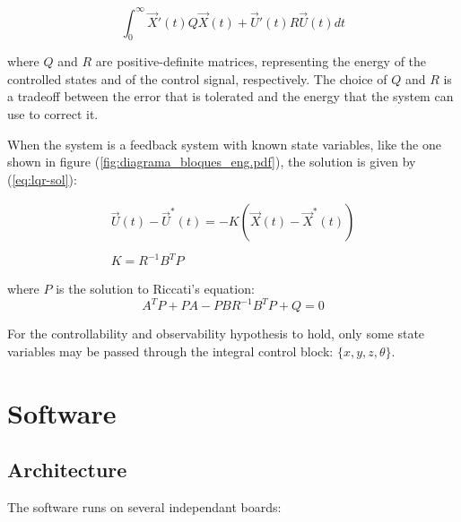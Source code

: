 \documentclass[conference]{IEEEtran}
\newcommand{\refp}[1]{(\ref{#1})}
\begin{document}
\begin{equation}
\label{eq:lqr}
\int_{0}^{\infty}  \vec{X}'(t)Q \vec{X}(t)+\vec{U}'(t)R\vec{U}(t)dt
\end{equation}

where $Q$ and $R$ are positive-definite matrices, representing the energy of the controlled states and of the control signal, respectively. The choice of $Q$ and $R$ is a tradeoff between the error that is tolerated and the energy that the system can use to correct it.

 When the system is a feedback system with known state variables, like the one shown in figure \refp{fig:diagrama_bloques_eng.pdf}, the solution is given by \refp{eq:lqr-sol}:

\begin{equation}
\begin{array}{c}
\vec{U}(t)-\vec{U}^*(t) = -K(\vec{X}(t)-\vec{X}^*(t))\\
\\
K = R^{-1}B^TP
\end{array}
\label{eq:lqr-sol}
\end{equation}

where $P$ is the solution to Riccati's equation:
\begin{equation}
  \label{eq:riccati}
  A^TP + PA - PBR^{-1}B^TP + Q = 0
\end{equation}

For the controllability and observability hypothesis to hold, only some state variables may be passed through the integral control block: $\{x,y,z,\theta\}$.

\section{Software}

\subsection{Architecture}
\label{sec:software-arch}

The software runs on several independant boards:
\end{document}

